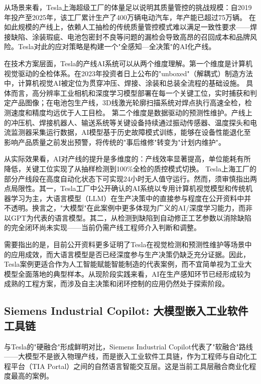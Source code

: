 \documentclass[12pt,a4paper]{ctexart}
\begin{document}
从场景来看，Tesla上海超级工厂的体量足以说明其质量管控的挑战规模：自2019年投产至2025年，该工厂累计生产了400万辆电动汽车，年产能已超过75万辆。\cite{blockchain2025tesla} 在如此规模的产线上，依赖人工抽检的传统质量管控模式难以满足一致性要求——焊接缺陷、涂装瑕疵、电池包密封不良等问题的漏检会导致高昂的召回成本和品牌风险。Tesla对此的应对策略是构建一个"全感知—全决策"的AI化产线。

在技术方案层面，Tesla的产线AI系统可以从两个维度理解。第一个维度是计算机视觉驱动的全检体系。在2023年投资者日上公布的"unboxed"（解耦式）制造方法中，计算机视觉AI被定位为贯穿冲压、焊接、涂装和总装全流程的基础设施。\cite{aicadium2024tesla} 具体而言，高分辨率工业相机和深度学习模型部署在每一个关键工位，实时捕获和判定产品图像；在电池包生产线，3D线激光轮廓扫描系统对焊点执行高速全检，检测速度和精度均远优于人工目检。\cite{blockchain2025tesla} 第二个维度是数据驱动的预测性维护。产线上的冲压机、焊接机器人、输送系统等关键设备持续通过振动传感器、温度探头和电流监测器采集运行数据，AI模型基于历史故障模式训练，能够在设备性能退化至影响产品质量之前发出预警，将传统的"事后维修"转变为"计划内维护"。

从实际效果看，AI对产线的提升是多维度的：产线效率显著提高，单位能耗有所降低，关键工位实现了从抽样检测到100\%全检的质控模式切换。\cite{blockchain2025tesla} Tesla上海工厂的部分产线段在高度自动化状态下可实现24小时无人值守运行。然而，须审慎指出两点局限性。其一，Tesla工厂中公开确认的AI系统以专用计算机视觉模型和传统机器学习为主，大语言模型（LLM）在生产决策中的直接参与程度在公开资料中并不透明。换言之，"大模型"在此案例中更多体现为广义的AI/深度学习能力，而非以GPT为代表的语言模型。其二，从检测到缺陷到自动修正工艺参数以消除缺陷的完全闭环尚未实现——当前仍需产线工程师介入判断和调整。

需要指出的是，目前公开资料更多证明了Tesla在视觉检测和预测性维护等场景中的应用成效，而大语言模型是否已经深度参与生产决策仍缺乏充分证据。因此，Tesla案例更适合作为人工智能赋能智能制造的代表案例，而不宜简单视为工业大模型全面落地的典型样本。从现阶段实践来看，AI在生产感知环节已经形成较为成熟的工程方案，而涉及自主决策和闭环控制的应用仍然处于探索阶段。

\subsection{Siemens Industrial Copilot: 大模型嵌入工业软件工具链}

与Tesla的"硬融合"形成鲜明对比，Siemens Industrial Copilot代表了"软融合"路线——大模型不是嵌入物理产线，而是嵌入工业软件工具链，作为工程师与自动化工程平台（TIA Portal）之间的自然语言智能交互层。这是当前工具层融合商业化程度最高的案例。
\end{document}
